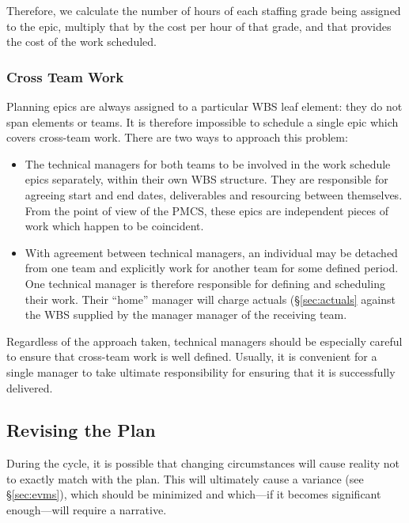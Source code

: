 Therefore, we calculate the number of hours of each staffing grade being
assigned to the epic, multiply that by the cost per hour of that grade,
and that provides the cost of the work scheduled.

\subsubsection{Cross Team Work}
\label{sec:cross-team}

Planning epics are always assigned to a particular WBS leaf element:
they do not span elements or teams. It is therefore impossible to
schedule a single epic which covers cross-team work. There are two ways
to approach this problem:

\begin{itemize}
\item
  The technical managers for both teams to be involved in the work
  schedule epics separately, within their own WBS structure. They are
  responsible for agreeing start and end dates, deliverables and
  resourcing between themselves. From the point of view of the PMCS,
  these epics are independent pieces of work which happen to be
  coincident.
\item
  With agreement between technical managers, an individual may be
  detached from one team and explicitly work for another team for some
  defined period. One technical manager is therefore responsible for
  defining and scheduling their work. Their ``home'' manager will charge
  actuals (\S\ref{sec:actuals} against the WBS supplied
  by the manager manager of the receiving team.
\end{itemize}

Regardless of the approach taken, technical managers should be
especially careful to ensure that cross-team work is well defined.
Usually, it is convenient for a single manager to take ultimate
responsibility for ensuring that it is successfully delivered.

\subsection{Revising the Plan}
\label{sec:cycle-change}

During the cycle, it is possible that changing circumstances will cause
reality not to exactly match with the plan. This will ultimately cause a
variance (see \S\ref{sec:evms}), which should be minimized
and which---if it becomes significant enough---will require a narrative.

